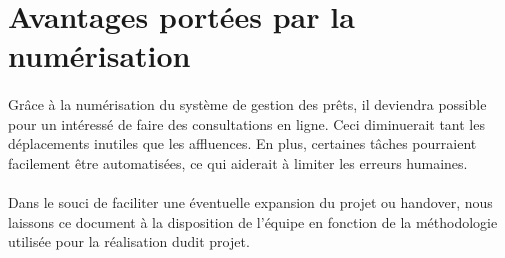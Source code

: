     \section{Avantages portées par la numérisation}
\paragraph{}
Grâce à la numérisation du système de gestion des prêts,
il deviendra possible pour un intéressé de faire des consultations
en ligne. Ceci diminuerait tant les déplacements inutiles que les 
affluences. En plus, certaines tâches pourraient facilement être 
automatisées, ce qui aiderait à limiter les erreurs humaines.   
\paragraph{}
Dans le souci de faciliter une éventuelle expansion du projet ou handover, 
nous laissons ce document à la disposition de l'équipe en fonction de la méthodologie 
utilisée pour la réalisation dudit projet.